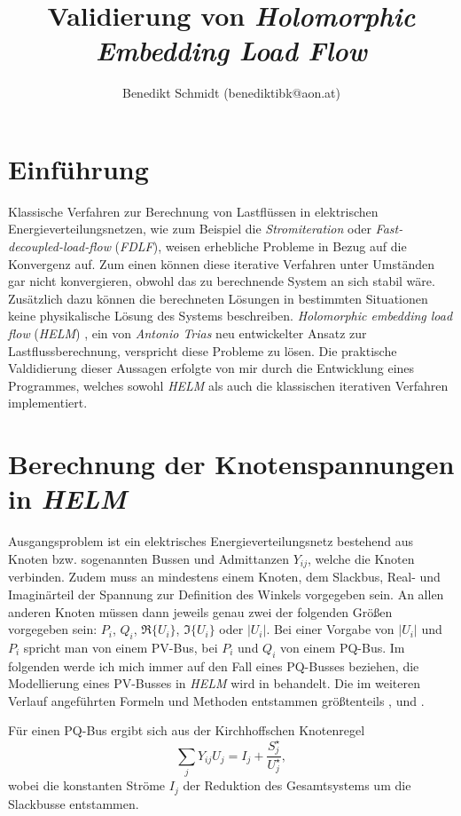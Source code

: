 \documentclass[12pt,a4paper]{article}
\author{Benedikt Schmidt (benediktibk@aon.at)}
\title{Validierung von \emph{Holomorphic Embedding Load Flow}}
\begin{document}
	\maketitle
	\newpage
	\tableofcontents
	\newpage
	
	\section{Einführung}
	Klassische Verfahren zur Berechnung von Lastflüssen in elektrischen Energieverteilungsnetzen, wie zum Beispiel die \emph{Stromiteration} oder \emph{Fast-de\-cou\-pled-load-flow} (\emph{FDLF}), weisen erhebliche Probleme in Bezug auf die Konvergenz auf. Zum einen können diese iterative Verfahren unter Umständen gar nicht konvergieren, obwohl das zu berechnende System an sich stabil wäre. Zusätzlich dazu können die berechneten Lösungen in bestimmten Situationen keine physikalische Lösung des Systems beschreiben. \emph{Holomorphic embedding load flow} (\emph{HELM}) \cite{helmIEEE}, ein von \emph{Antonio Trias} neu entwickelter Ansatz zur Lastflussberechnung, verspricht diese Probleme zu lösen. Die praktische Valdidierung dieser Aussagen erfolgte von mir durch die Entwicklung eines Programmes, welches sowohl \emph{HELM} als auch die klassischen iterativen Verfahren implementiert.
	
	\section{Berechnung der Knotenspannungen in \emph{HELM}}
	Ausgangsproblem ist ein elektrisches Energieverteilungsnetz bestehend aus Knoten bzw. sogenannten Bussen und Admittanzen $Y_{ij}$, welche die Knoten verbinden. Zudem muss an mindestens einem Knoten, dem Slackbus, Real- und Imaginärteil der Spannung zur Definition des Winkels vorgegeben sein. An allen anderen Knoten müssen dann jeweils genau zwei der folgenden Größen vorgegeben sein: $P_i$, $Q_i$, $\Re\{U_i\}$, $\Im\{U_i\}$ oder $|U_i|$. Bei einer Vorgabe von $|U_i|$ und $P_i$ spricht man von einem PV-Bus, bei $P_i$ und $Q_i$ von einem PQ-Bus. Im folgenden werde ich mich immer auf den Fall eines PQ-Busses beziehen, die Modellierung eines PV-Busses in \emph{HELM} wird in \cite{helmPV} behandelt. Die im weiteren Verlauf angeführten Formeln und Methoden entstammen größtenteils \cite{helmIEEE}, \cite{helmPatentApr2009} und \cite{helmPatentSept2009}.
	
	Für einen PQ-Bus ergibt sich aus der Kirchhoffschen Knotenregel
	\begin{equation}
		\sum_j Y_{ij} U_{j} = I_j + \frac{S_j^\star}{U_j^\star},
		\label{eq:loadflow}
	\end{equation}
	wobei die konstanten Ströme $I_j$ der Reduktion des Gesamtsystems um die Slackbusse entstammen.
	
\end{document}
